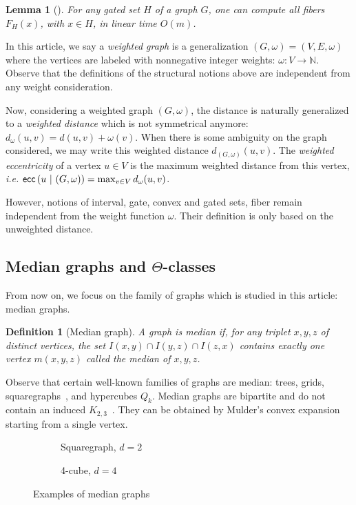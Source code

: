 \documentclass[11pt,letterpaper]{article}
\newtheorem{lemma}{Lemma}
\newtheorem{definition}{Definition}
\newcommand{\wecc}[2]{\mbox{\textsf{ecc}}\left(#1 ~\vert ~ #2\right)}
\begin{document}
\begin{lemma}[\cite{ChLaRa18,ChLaRa19}]
For any gated set $H$ of a graph $G$, one can compute all fibers $F_H(x)$, with $x\in H$, in linear time $O(m)$.
\label{le:compute_gates}
\end{lemma}

In this article, we say a \textit{weighted graph} is a generalization $(G,\omega)=(V,E,\omega)$ where the vertices are labeled with nonnegative integer weights: $\omega : V \rightarrow \mathbb{N}$. Observe that the definitions of the structural notions above are independent from any weight consideration.

Now, considering a weighted graph $(G,\omega)$, the distance is naturally generalized to a \textit{weighted distance} which is not symmetrical anymore: $d_{\omega}(u,v) = d(u,v) + \omega(v)$. When there is some ambiguity on the graph considered, we may write this weighted distance $d_{(G,\omega)}(u,v)$. The \textit{weighted eccentricity} of a vertex $u \in V$ is the maximum weighted distance from this vertex, {\em i.e.} $\wecc{u}{(G,\omega)} = \max_{v \in V} d_{\omega}(u,v)$. 

However, notions of interval, gate, convex and gated sets, fiber remain independent from the weight function $\omega$. Their definition is only based on the unweighted distance.

\subsection{Median graphs and $\Theta$-classes}

From now on, we focus on the family of graphs which is studied in this article: median graphs. 

\begin{definition}[Median graph]
A graph is \textit{median} if, for any triplet $x,y,z$ of distinct vertices, the set $I(x,y) \cap I(y,z) \cap I(z,x)$ contains exactly one vertex $m(x,y,z)$ called the median of $x,y,z$.
\label{def:median}
\end{definition}

Observe that certain well-known families of graphs are median: trees, grids, squaregraphs~\cite{BaChEp10}, and hypercubes $Q_k$.
Median graphs are bipartite and do not contain an induced $K_{2,3}$~\cite{BaCh08,HaImKl11,Mu78}. They can be obtained by Mulder's convex expansion~\cite{Mu78,Mu80} starting from a single vertex.

\begin{figure}[h]
\begin{subfigure}[b]{0.48\columnwidth}
\centering
\scalebox{0.6}{}
\caption{Squaregraph, $d=2$}
\end{subfigure}
\begin{subfigure}[b]{0.48\columnwidth}
\centering
\scalebox{0.6}{}
\caption{4-cube, $d=4$}
\end{subfigure}

\caption{Examples of median graphs}
\label{fig:median_examples}
\end{figure}
\end{document}
